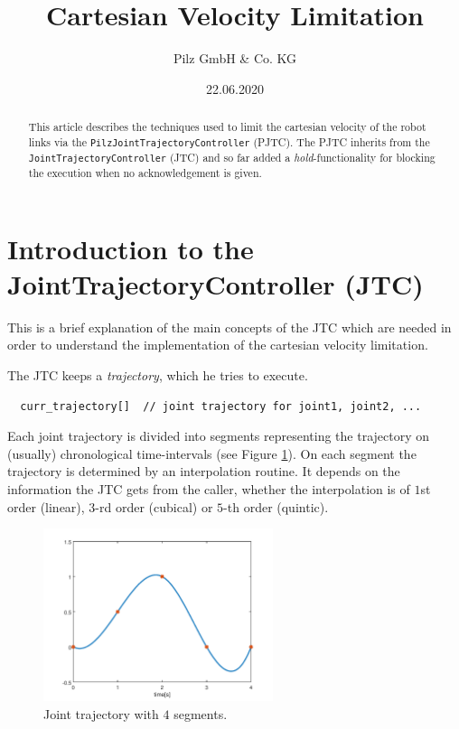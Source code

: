 \documentclass{article}
\begin{document}
\title{Cartesian Velocity Limitation}
\author{Pilz GmbH \& Co. KG}
\date{22.06.2020}

\maketitle

\begin{abstract}
  \noindent This article describes the techniques used to limit the cartesian velocity of the robot links via the \verb!PilzJointTrajectoryController! (PJTC). The PJTC inherits from the \verb!JointTrajectoryController! (JTC) and so far added a \emph{hold}-functionality for blocking the execution when no acknowledgement is given.
\end{abstract}


\section{Introduction to the JointTrajectoryController (JTC)}
This is a brief explanation of the main concepts of the JTC which are needed in order to understand the implementation of the cartesian velocity limitation.

The JTC keeps a \emph{trajectory}, which he tries to execute.
\begin{verbatim}
  curr_trajectory[]  // joint trajectory for joint1, joint2, ...
\end{verbatim}
Each joint trajectory is divided into segments representing the trajectory on (usually) chronological time-intervals (see Figure \ref{fig:spline}). On each segment the trajectory is determined by an interpolation routine. It depends on the information the JTC gets from the caller, whether the interpolation is of $1$st order (linear), $3$-rd order (cubical) or $5$-th order (quintic).

\begin{figure}
\centering
\includegraphics[width=0.6\textwidth]{figures/spline_plot.png}
\caption{Joint trajectory with $4$ segments.}
\label{fig:spline}
\end{figure}
\end{document}

